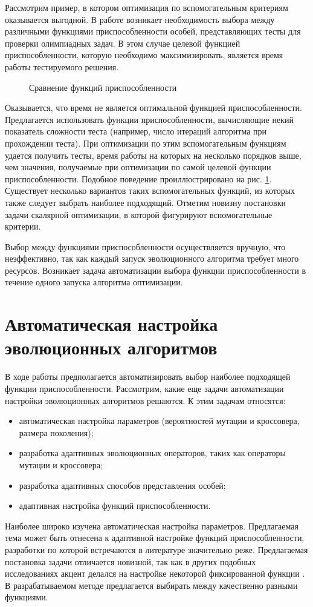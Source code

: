 Рассмотрим пример, в котором оптимизация по вспомогательным критериям оказывается выгодной. В работе \cite{master} возникает необходимость выбора между различными функциями приспособленности особей, представляющих тесты для проверки олимпиадных задач. В этом случае целевой функцией приспособленности, которую необходимо максимизировать, является время работы тестируемого решения.

\begin{figure}[h!]
\caption{Сравнение функций приспособленности}
\label{pict:chart1}
\end{figure}

Оказывается, что время не является оптимальной функцией приспособленности. Предлагается использовать функции приспособленности, вычисляющие некий показатель сложности теста (например, число итераций алгоритма при прохождении теста). При оптимизации по этим вспомогательным функциям  удается получить тесты, время работы на которых на несколько порядков выше, чем значения, получаемые при оптимизации по самой целевой функции приспособленности. Подобное поведение проиллюстрировано на рис. \ref{pict:chart1}. Существует несколько вариантов таких вспомогательных функций, из которых также следует выбрать наиболее подходящий. Отметим новизну постановки задачи скалярной оптимизации, в которой фигурируют вспомогательные критерии.

Выбор между функциями приспособленности осуществляется вручную, что неэффективно, так как каждый запуск эволюционного алгоритма требует много ресурсов. Возникает задача автоматизации выбора функции приспособленности в течение одного запуска алгоритма оптимизации.


\section{Автоматическая настройка эволюционных алгоритмов}\label{ga}
В ходе работы предполагается автоматизировать выбор наиболее подходящей функции приспособленности. Рассмотрим, какие еще задачи автоматизации настройки эволюционных алгоритмов  решаются. К этим задачам относятся:
\begin{itemize}
  \item автоматическая настройка параметров (вероятностей мутации и кроссовера, размера поколения);
 	\item разработка адаптивных эволюционных операторов, таких как операторы мутации и кроссовера;
 	\item разработка адаптивных способов представления особей;
 	\item адаптивная настройка функций приспособленности.
\end{itemize}
Наиболее широко изучена автоматическая настройка параметров. Предлагаемая тема может быть отнесена к адаптивной настройке функций приспособленности, разработки по которой встречаются в литературе значительно реже. Предлагаемая постановка задачи отличается новизной, так как в других подобных исследованиях акцент делался на настройке некоторой фиксированной функции \cite{filtered-ff}. В разрабатываемом методе предлагается выбирать между качественно разными функциями.

